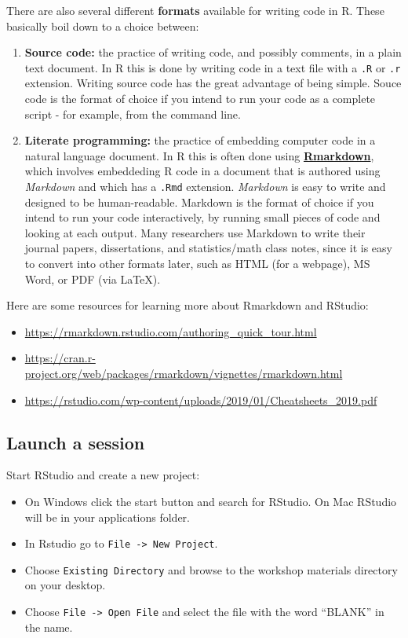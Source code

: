 \documentclass[
]{book}
\providecommand{\tightlist}{%
  \setlength{\itemsep}{0pt}\setlength{\parskip}{0pt}}
\begin{document}
There are also several different \textbf{formats} available for writing code in R.
These basically boil down to a choice between:

\begin{enumerate}
\def\labelenumi{\arabic{enumi}.}
\item
  \textbf{Source code:} the practice of writing code, and possibly comments, in a plain text document. In R this is done by writing code in a text file with a \texttt{.R} or \texttt{.r} extension. Writing source code has the great advantage of being simple. Souce code is the format of choice if you intend to run your code as a complete script - for example, from the command line.
\item
  \textbf{Literate programming:} the practice of embedding computer code in a natural language document. In R this is often done using \href{https://rmarkdown.rstudio.com/}{\textbf{Rmarkdown}}, which involves embeddeding R code in a document that is authored using \emph{Markdown} and which has a \texttt{.Rmd} extension. \emph{Markdown} is easy to write and designed to be human-readable. Markdown is the format of choice if you intend to run your code interactively, by running small pieces of code and looking at each output. Many researchers use Markdown to write their journal papers, dissertations, and statistics/math class notes, since it is easy to convert into other formats later, such as HTML (for a webpage), MS Word, or PDF (via LaTeX).
\end{enumerate}

Here are some resources for learning more about Rmarkdown and RStudio:

\begin{itemize}
\tightlist
\item
  \url{https://rmarkdown.rstudio.com/authoring_quick_tour.html}
\item
  \url{https://cran.r-project.org/web/packages/rmarkdown/vignettes/rmarkdown.html}
\item
  \url{https://rstudio.com/wp-content/uploads/2019/01/Cheatsheets_2019.pdf}
\end{itemize}

\hypertarget{launch-a-session}{%
\subsection{Launch a session}\label{launch-a-session}}

Start RStudio and create a new project:

\begin{itemize}
\tightlist
\item
  On Windows click the start button and search for RStudio. On Mac
  RStudio will be in your applications folder.
\item
  In Rstudio go to \texttt{File\ -\textgreater{}\ New\ Project}.
\item
  Choose \texttt{Existing\ Directory} and browse to the workshop materials directory on your desktop.
\item
  Choose \texttt{File\ -\textgreater{}\ Open\ File} and select the file with the word ``BLANK'' in the name.
\end{itemize}
\end{document}
